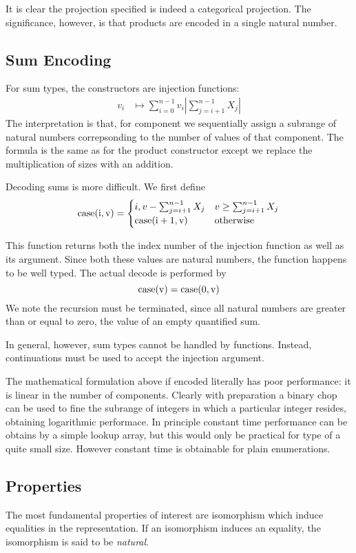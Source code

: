 \documentclass{article}
\begin{document}
It is clear the projection specified is indeed a categorical projection.
The significance, however, is that products are encoded in a single natural
number.

\subsection{Sum Encoding}
For sum types, the constructors are injection functions:
\begin{align*}
v_i &\mapsto \sum_{i=0}^{n-1}v_i | \sum_{j=i+1}^{n-1} X_j|
\end{align*}
The interpretation is that, for component we sequentially assign a subrange
of natural numbers correpsonding to the number of values of that component.
The formula is the same as for the product constructor except we replace
the multiplication of sizes with an addition.

Decoding sums is more difficult. We first define
$$
\rm{case} (i,v) = \begin{cases}
  i, v - \sum_{j=i+1}^{n-1}X_j& v \ge \sum_{j=i+1}^{n-1}X_j\\
  \rm{case} (i+1,v) & \text{otherwise}
\end{cases}
$$

This function returns both the index number of the injection function
as well as its argument. Since both these values are natural numbers,
the function happens to be well typed. The actual decode is performed by
$$\rm{case} (v) = \rm{case}(0,v)$$
We note the recursion must be terminated, since all natural numbers are
greater than or equal to zero, the value of an empty quantified sum.

In general, however, sum types cannot be handled by functions. Instead,
continuations must be used to accept the injection argument.

The mathematical formulation above if encoded literally has poor performance:
it is linear in the number of components. Clearly with preparation a binary chop
can be used to fine the subrange of integers in which a particular integer resides,
obtaining logarithmic performace. In principle constant time performance can
be obtains by a simple lookup array, but this would only be practical for
type of a quite small size. However constant time is obtainable for plain
enumerations.

\subsection{Properties}
The most fundamental properties of interest are isomorphism which
induce equalities in the representation. If an isomorphism induces
an equality, the isomorphism is said to be {\em natural}.
\end{document}
